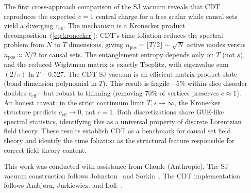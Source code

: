 \documentclass[aps,prd,twocolumn,superscriptaddress,nofootinbib]{revtex4-2}
\begin{document}
The first cross-approach comparison of the SJ vacuum reveals that CDT reproduces the expected $c = 1$ central charge for a free scalar while causal sets yield a diverging $c_{\mathrm{eff}}$. The mechanism is a Kronecker product decomposition~(\ref{eq:kronecker}): CDT's time foliation reduces the spectral problem from $N$ to $T$ dimensions, giving $n_{\mathrm{pos}} = \lfloor T/2 \rfloor \sim \sqrt{N}$ active modes versus $n_{\mathrm{pos}} \approx N/2$ for causal sets. The entanglement entropy depends only on $T$ (not $s$), and the reduced Wightman matrix is exactly Toeplitz, with eigenvalue sum $(2/\pi)\ln T + 0.527$. The CDT SJ vacuum is an efficient matrix product state (bond dimension polynomial in $T$). This result is fragile---$5\%$ within-slice disorder doubles $c_{\mathrm{eff}}$---but robust to thinning (removing $70\%$ of vertices preserves $c \approx 1$). An honest caveat: in the strict continuum limit $T, s \to \infty$, the Kronecker structure predicts $c_{\mathrm{eff}} \to 0$, not $c = 1$. Both discretizations share GUE-like spectral statistics, identifying this as a universal property of discrete Lorentzian field theory. These results establish CDT as a benchmark for causal set field theory and identify the time foliation as the structural feature responsible for correct field theory content.

\begin{acknowledgments}
This work was conducted with assistance from Claude (Anthropic). The SJ vacuum construction follows Johnston~\cite{johnston2009} and Sorkin~\cite{sorkin2012}. The CDT implementation follows Ambj\o{}rn, Jurkiewicz, and Loll~\cite{ambjorn2001}.
\end{acknowledgments}
\end{document}
